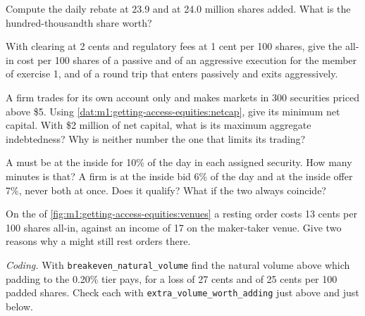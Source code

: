 \begin{exercise}[$\star$]\label{exo:m1:getting-access-equities:2}
Compute the daily rebate at 23.9 and at 24.0 million shares added. What is the
hundred-thousandth share worth?
\end{exercise}

\begin{exercise}[$\star$]\label{exo:m1:getting-access-equities:3}
With clearing at 2 cents and regulatory fees at 1 cent per 100 shares, give
the all-in cost per 100 shares of a passive and of an aggressive execution
for the member of exercise 1, and of a round trip that enters passively and
exits aggressively.
\end{exercise}

\begin{exercise}[$\star\star$]\label{exo:m1:getting-access-equities:4}
A firm trades for its own account only and makes markets in 300 securities
priced above \$5. Using \cref{dat:m1:getting-access-equities:netcap}, give its
minimum net capital. With \$2 million of net capital, what is its maximum
aggregate indebtedness? Why is neither number the one that limits its
trading?
\end{exercise}

\begin{exercise}[$\star\star$]\label{exo:m1:getting-access-equities:5}
A  must be at the inside for 10\% of the day in
each assigned security. How many minutes is that? A firm is at the inside
bid 6\% of the day and at the inside offer 7\%, never both at once. Does it
qualify? What if the two always coincide?
\end{exercise}

\begin{exercise}[$\star\star$]\label{exo:m1:getting-access-equities:6}
On the  of \cref{fig:m1:getting-access-equities:venues} a
resting order costs 13 cents per 100 shares all-in, against an income of 17 on
the maker-taker venue. Give two reasons why a  might still rest
orders there.
\end{exercise}

\begin{exercise}[$\star\star\star$]\label{exo:m1:getting-access-equities:7}
\emph{Coding.} With \texttt{breakeven\_natural\_volume} find the natural volume
above which padding to the 0.20\% tier pays, for a loss of 27 cents and of 25
cents per 100 padded shares. Check each with
\texttt{extra\_volume\_worth\_adding} just above and just below.
\end{exercise}

